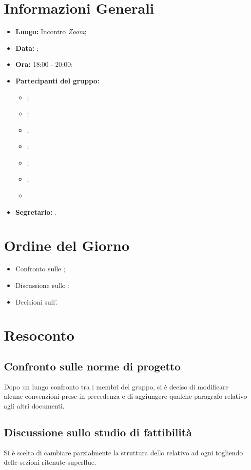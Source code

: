 \section{Informazioni Generali}
\begin{itemize}
\item \textbf{Luogo:} Incontro \textit{Zoom};
\item \textbf{Data:} \Data;
\item \textbf{Ora:} 18:00 - 20:00;
\item \textbf{Partecipanti del gruppo:}
	\begin{itemize}
		\item \BL{}; 
		\item \FF{};
		\item \MM{}; 
		\item \PC{};
		\item \TG{};
		\item \TL{};
		\item \VD{}.
	\end{itemize} 
\item \textbf{Segretario:} \PC{}.
\end{itemize}

\section{Ordine del Giorno}
\begin{itemize}
 \item Confronto sulle \textit{\NdP};
 \item Discussione sullo \textit{\SdF};
 \item Decisioni sull'\textit{\AdR}.
\end{itemize}

\section{Resoconto}
\subsection{Confronto sulle norme di progetto}
Dopo un lungo confronto tra i membri del gruppo, si è deciso di modificare alcune convenzioni prese in precedenza e di aggiungere qualche paragrafo relativo agli altri documenti.

\subsection{Discussione sullo studio di fattibilità}
Si è scelto di cambiare parzialmente la struttura dello \textit{\SdF} relativo ad ogni  togliendo delle sezioni ritenute superflue.

